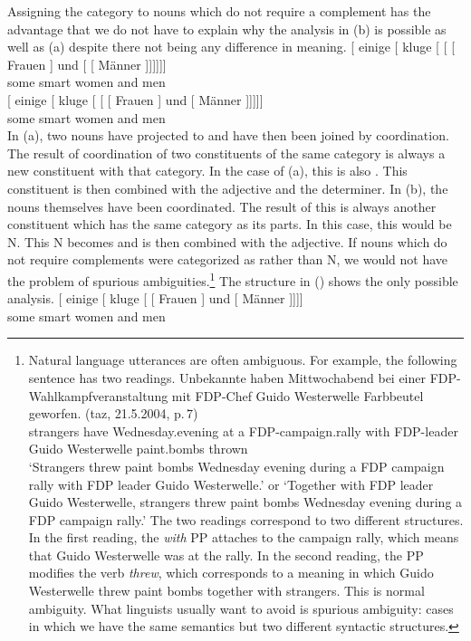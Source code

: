 Assigning the category \nbar to nouns which do not require a complement has the advantage that we do not have to explain why the analysis in (b) is possible as well
as (a) despite there not being any difference in meaning.
\eal
\ex 
\gll {}[ einige [\sub{\nbar} kluge [\sub{\nbar} [\sub{\nbar} [ Frauen ] und  [\sub{\nbar} [ Männer ]]]]]]\\
	 {}      some   {}           smart {}          {}           {}       women  {} and {} {}          men\\
\ex 
\gll {}[ einige [\sub{\nbar} kluge [\sub{\nbar} [ [ Frauen ] und [ Männer
]]]]]\\
	{}       some   {}           smart {}          {}       {}       women  {} and {} men\\
\zl
%
In (a), two nouns have projected to \nbar and have then been joined by coordination. The result of coordination
of two constituents of the same category is always a new constituent with that category. In the case of (a), this
is also \nbar. This constituent is then combined with the adjective and the determiner. In (b), the nouns themselves
have been coordinated. The result of this is always another constituent which has the same category as its parts. In this case,
this would be N. This N becomes \nbar and is then combined with the adjective. If nouns which do not require complements were
categorized as \nbar rather than N, we would not have the problem of spurious
ambiguities.\footnote{
Natural language utterances are often ambiguous. For example, the following sentence has two
readings.
\ea
\gll Unbekannte haben Mittwochabend bei einer FDP-Wahlkampfveranstaltung mit FDP-Chef Guido Westerwelle Farbbeutel geworfen. (taz, 21.5.2004, p.\,7)\\
     strangers  have  Wednesday.evening at a FDP-campaign.rally  with FDP-leader Guido Westerwelle
     paint.bombs thrown\\
\glt `Strangers threw paint bombs Wednesday evening during a FDP campaign rally with FDP leader
Guido Westerwelle.' or `Together with FDP leader Guido Westerwelle, strangers threw paint bombs Wednesday evening during a FDP campaign rally.'
\z
The two readings correspond to two different structures. In the first reading, the \emph{with} PP
attaches to the campaign rally, which means that Guido Westerwelle was at the rally. In the second
reading, the PP modifies the verb \emph{threw}, which corresponds to a meaning in which Guido
Westerwelle threw paint bombs together with strangers. This is normal ambiguity. What linguists
usually want to avoid is spurious ambiguity: cases in which we have the same semantics but two
different syntactic structures.
}
The structure in () shows the only possible analysis.
\ea
\gll {}[ einige [\sub{\nbar} kluge [\sub{\nbar} [\sub{\nbar} Frauen ] und [\sub{\nbar} Männer
]]]]\\
      {}	some    {}           smart {}          {}           women  {}  and {} men\\
\z


